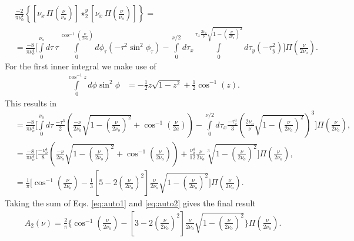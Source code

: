 \documentclass{osa-article}
\begin{document}
\begin{align}
  &\frac{-2}{\pi\nu_0^4}\left\{\left[\nu_x\, \Pi\left(\frac{\nu}{\nu_o}\right)\right] \star_2^y \left[\nu_x\, \Pi\left(\frac{\nu}{\nu_o}\right)\right]\right\} = \\
  &=  \frac{-8}{\pi\nu_o^4}\Bigg[\int\limits_0^{\nu_o} d\tau\, \tau \int\limits_0^{\cos^{-1}\left(\frac{\nu}{2\nu_o}\right)}d\phi_{\tau}(-\tau^2\sin^2\phi_{\tau}) - \int\limits_0^{\nu/2}d\tau_x \int\limits_0^{\tau_x \frac{2\nu_o}{\nu}\sqrt{1 - \left(\frac{\nu}{2\nu_o}\right)^2}}d\tau_y(-\tau_y^2)\Bigg]\Pi\left(\frac{\nu}{2\nu_o}\right).
\end{align}
For the first inner integral we make use of
\begin{align}
  \int\limits_0^{\cos^{-1}z} d\phi \sin^2\phi &= -\frac{1}{2}z\sqrt{1 - z^2} + \frac{1}{2}\cos^{-1}(z).
\end{align}
This results in
\begin{align}
  &=\frac{-8}{\pi\nu_o^4}\Bigg[\int\limits_0^{\nu_o} d\tau\, \frac{-\tau^3}{2}\left(\frac{-\nu}{2\nu_o}\sqrt{1 - \left(\frac{\nu}{2\nu_o}\right)^2} + \cos^{-1}\left(\frac{\nu}{2a}\right)\right) - \int\limits_0^{\nu/2}d\tau_x \frac{-\tau_x^3}{3}\left(\frac{2 \nu_o}{\nu}\sqrt{1 - \left(\frac{\nu}{2\nu_o}\right)^2}\right)^3\Bigg]\Pi\left(\frac{\nu}{2\nu_o}\right),\\
  &=  \frac{-8}{\pi\nu_o^4}\Bigg[\frac{-\nu_o^4}{8}\left(\frac{-\nu}{2\nu_o}\sqrt{1 - \left(\frac{\nu}{2\nu_o}\right)^2} + \cos^{-1}\left(\frac{\nu}{2\nu_o}\right) \right) + \frac{\nu_o^4}{12}\frac{\nu}{2\nu_o}\sqrt[3]{1 - \left(\frac{\nu}{2\nu_o}\right)^2}\Bigg]\Pi\left(\frac{\nu}{2\nu_o}\right),\\
  &=  \frac{1}{\pi}\Bigg[\cos^{-1}\left(\frac{\nu}{2\nu_o}\right) - \frac{1}{3}\left[5 - 2\left(\frac{\nu}{2\nu_o}\right)^2\right]\frac{\nu}{2\nu_o}\sqrt{1 - \left(\frac{\nu}{2\nu_o}\right)^2}\Bigg]\Pi\left(\frac{\nu}{2\nu_o}\right). \label{eq:auto2}
\end{align}
Taking the sum of Eqs. \ref{eq:auto1} and \ref{eq:auto2} gives the final result
\begin{align}
  A_2(\nu) = \frac{2}{\pi}\Bigg\{\cos^{-1}\left(\frac{\nu}{2\nu_o}\right) - \left[3 - 2\left(\frac{\nu}{2\nu_o}\right)^2\right]\frac{\nu}{2\nu_o}\sqrt{1 - \left(\frac{\nu}{2\nu_o}\right)^2}\Bigg\}\Pi\left(\frac{\nu}{2\nu_o}\right). 
\end{align}
\end{document}
